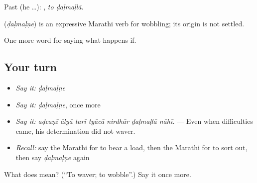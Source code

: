 Past (he …):  , \emph{to ḍaḷmaḷlā}.

\begin{cousinweb}
\textbf{} (\emph{ḍaḷmaḷṇe}) is an expressive Marathi verb for wobbling; its origin is not settled.
\end{cousinweb}

\begin{grammarlens}[title={What you've built}]
One more word for saying what happens if.
\end{grammarlens}

\subsection*{Your turn}
\begin{itemize}
\raggedright
  \item \emph{Say it:} \emph{ḍaḷmaḷṇe}
  \item \emph{Say it:} \emph{ḍaḷmaḷṇe}, once more
  \item \emph{Say it:} \emph{aḍcaṇī ālyā tarī tyācā nirdhār ḍaḷmaḷlā nāhī.} — Even when difficulties came, his determination did not waver.
  \item \emph{Recall:} say the Marathi for to bear a load, then the Marathi for to sort out, then say \emph{ḍaḷmaḷṇe} again
\end{itemize}

\begin{tcolorbox}[breakable,colback=teal!4,colframe=teal!35!black,title={Before you move on}]
What does  mean? (\textquotedblleft{}To waver; to wobble\textquotedblright{}.) Say it once more.
\end{tcolorbox}

